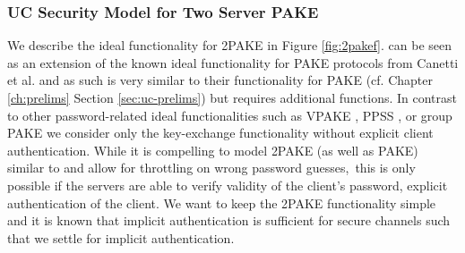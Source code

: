 \subsubsection{UC Security Model for Two Server PAKE}\label{sec:2pakesecurity}
We describe the ideal functionality \FTWOPAKE for \ac{2PAKE} in Figure \ref{fig:2pakef}.
\FTWOPAKE can be seen as an extension of the known ideal functionality for \ac{PAKE} protocols from Canetti et al. \cite{Canetti2005} and as such \FTWOPAKE is very similar to their functionality for \ac{PAKE} (cf. Chapter \ref{ch:prelims} Section \ref{sec:uc-prelims}) but requires additional functions.
In contrast to other password-related ideal functionalities such as \ac{VPAKE} \cite{Gentry2006}, \ac{PPSS} \cite{Camenisch2012}, or group \ac{PAKE} \cite{AbdallaCGP11} we consider only the key-exchange functionality without explicit client authentication.
While it is compelling to model \ac{2PAKE} (as well as \ac{PAKE}) similar to \cite{Camenisch2012} and allow for throttling on wrong password guesses,\footnotemark\ this is only possible if the servers are able to verify validity of the client's password, \ie explicit authentication of the client.
We want to keep the \ac{2PAKE} functionality simple and it is known that implicit authentication is sufficient for secure channels \cite{CanettiK01} such that we settle for implicit authentication.


